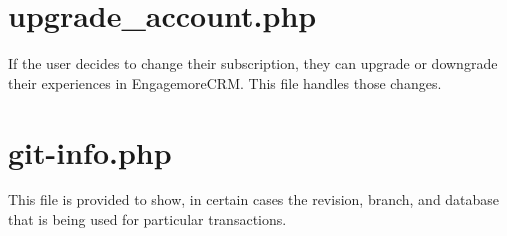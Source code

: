 \documentclass[final,letterpaper,12pt]{article}
\begin{document}
\begin{appendices}


\section{upgrade\_account.php}
\noindent If the user decides to change their subscription, they can upgrade or downgrade their experiences in EngagemoreCRM.  This file handles those changes.



\section{git-info.php}
\noindent This file is provided to show, in certain cases the revision, branch, and database that is being used for particular transactions.  



\end{appendices}
\end{document}
